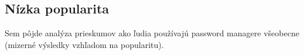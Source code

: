 \subsection{Nízka popularita}
Sem pôjde analýza prieskumov ako ľudia používajú password managere všeobecne (mizerné výsledky vzhľadom na popularitu).